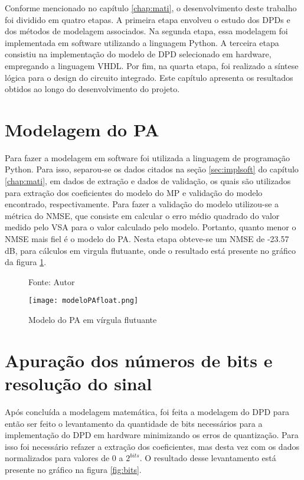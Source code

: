 Conforme mencionado no capítulo \ref{chap:mati}, o desenvolvimento deste trabalho foi dividido em quatro etapas. A primeira etapa envolveu o estudo dos DPDs e dos métodos de modelagem associados. Na segunda etapa, essa modelagem foi implementada em software utilizando a linguagem Python. A terceira etapa consistiu na implementação do modelo de DPD selecionado em hardware, empregando a linguagem VHDL. Por fim, na quarta etapa, foi realizado a síntese lógica para o design do circuito integrado. Este capítulo apresenta os resultados obtidos ao longo do desenvolvimento do projeto.

\section{Modelagem do PA}

Para fazer a modelagem em software foi utilizada a linguagem de programação Python. Para isso, separou-se os dados citados na seção \ref{sec:implsoft} do capítulo \ref{chap:mati}, em dados de extração e dados de validação, os quais são utilizados para extração dos coeficientes do modelo do MP e validação do modelo encontrado, respectivamente. Para fazer a validação do modelo utilizou-se a métrica do NMSE, que consiste em calcular o erro médio quadrado do valor medido pelo VSA para o valor calculado pelo modelo. Portanto, quanto menor o NMSE mais fiel é o modelo do PA. Nesta etapa obteve-se um NMSE de -23.57 dB, para cálculos em virgula flutuante, onde o resultado está presente no gráfico da figura \ref{fig:modelopafloat}.

\begin{figure}[ht!]
    \centering
    \captionsetup{justification=centering}
    \caption*{Fonte: Autor}
    \texttt{[image: modeloPAfloat.png]}
    \caption{Modelo do PA em vírgula flutuante}
    \label{fig:modelopafloat}
\end{figure}

\section{Apuração dos números de bits e resolução do sinal} 

Após concluída a modelagem matemática, foi feita a modelagem do DPD para então ser feito o levantamento da quantidade de bits necessários para a implementação do DPD em hardware minimizando os erros de quantização. 
Para isso foi necessário refazer a extração dos coeficientes, mas desta vez com os dados normalizados para valores de 0 a $2^{bits}$.  
O resultado desse levantamento está presente no gráfico na figura \ref{fig:bits}.

